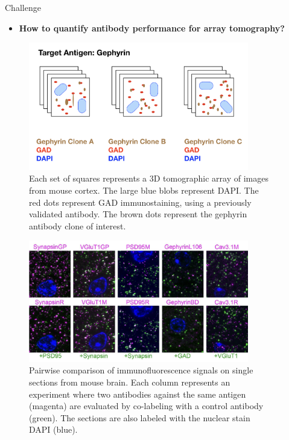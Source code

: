 \documentclass[final, table]{beamer}
\newlength{\sepwid}
\newlength{\onecolwid}
\begin{document}
\begin{frame}[t]  
\begin{columns}[t]  %

\begin{column}{\sepwid}\end{column}  %
\begin{column}{\onecolwid} 

\begin{block}{Challenge} 

\begin{itemize} 
\item \textbf{How to quantify antibody performance for array tomography? }
\end{itemize} 


\begin{figure}
\centering
\includegraphics[width=0.9\textwidth]{figs/issuesWithAntibodies}
\caption{Each set of squares represents a 3D tomographic array of images from mouse cortex. The large blue blobs represent DAPI.  The red dots represent GAD immunostaining, using a previously validated antibody. The brown dots represent the gephyrin antibody clone of interest. }
\label{fig:issueswithantibodies}
\end{figure}


\begin{figure}
\centering
\includegraphics[width=0.9\textwidth]{figs/pairwise}
\caption{Pairwise comparison of immunofluorescence signals on single sections from mouse brain. Each column represents an experiment where two antibodies against the same antigen (magenta) are evaluated by co-labeling with a control antibody (green). The sections are also labeled with the nuclear stain DAPI (blue).}
\label{fig:pariwise}
\end{figure}


\end{block}
\end{column}
\end{columns}
\end{frame}
\end{document}
